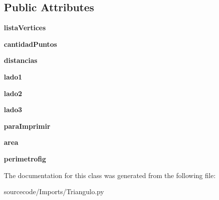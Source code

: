 \subsection*{Public Attributes}
\begin{DoxyCompactItemize}
\item 
\mbox{\label{class_imports_1_1_triangulo_1_1_isosceles_a8a9aab1533dcf3483649f0db6636bcd3}} 
{\bfseries lista\+Vertices}
\item 
\mbox{\label{class_imports_1_1_triangulo_1_1_isosceles_a54f9c0d8939caf0bb174de363ac8745e}} 
{\bfseries cantidad\+Puntos}
\item 
\mbox{\label{class_imports_1_1_triangulo_1_1_isosceles_a6ebf7f4fc4d60621f7fc219012e40760}} 
{\bfseries distancias}
\item 
\mbox{\label{class_imports_1_1_triangulo_1_1_isosceles_a4a7019dd65660263ce8735d6fe7b6841}} 
{\bfseries lado1}
\item 
\mbox{\label{class_imports_1_1_triangulo_1_1_isosceles_aef381f47d39f184278eaf6fd88bda9d5}} 
{\bfseries lado2}
\item 
\mbox{\label{class_imports_1_1_triangulo_1_1_isosceles_aaa6364106c10ec27b30c47a0e666b5c9}} 
{\bfseries lado3}
\item 
\mbox{\label{class_imports_1_1_triangulo_1_1_isosceles_a502f7d5f22f8bf7fd75b4b51a04189e3}} 
{\bfseries para\+Imprimir}
\item 
\mbox{\label{class_imports_1_1_triangulo_1_1_isosceles_a18f8fac309febc4afc96f28b9942443a}} 
{\bfseries area}
\item 
\mbox{\label{class_imports_1_1_triangulo_1_1_isosceles_a7595594cc4effb00a77a2990e39771a2}} 
{\bfseries perimetrofig}
\end{DoxyCompactItemize}


The documentation for this class was generated from the following file\+:\begin{DoxyCompactItemize}
\item 
sourcecode/\+Imports/Triangulo.\+py\end{DoxyCompactItemize}
